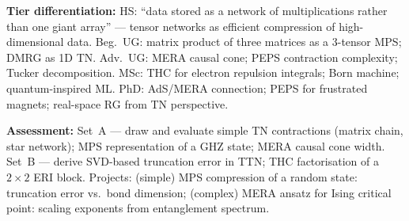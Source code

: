\documentclass[11pt,a4paper]{article}
\begin{document}
\begin{tcolorbox}[modulebox, title={Module~II.1 --- Lecture L08: Tensor Networks}]
\medskip\textbf{Tier differentiation:}
HS: ``data stored as a network of multiplications rather than one giant array'' ---
tensor networks as efficient compression of high-dimensional data.
Beg.\ UG: matrix product of three matrices as a 3-tensor MPS; DMRG as 1D TN.
Adv.\ UG: MERA causal cone; PEPS contraction complexity; Tucker decomposition.
MSc: THC for electron repulsion integrals; Born machine; quantum-inspired ML.
PhD: AdS/MERA connection; PEPS for frustrated magnets; real-space RG from TN perspective.

\medskip\textbf{Assessment:}
Set~A --- draw and evaluate simple TN contractions (matrix chain, star network);
MPS representation of a GHZ state; MERA causal cone width.
Set~B --- derive SVD-based truncation error in TTN; THC factorisation of a $2\times2$ ERI block.
Projects: (simple) MPS compression of a random state: truncation error vs.\ bond dimension;
(complex) MERA ansatz for Ising critical point: scaling exponents from entanglement spectrum.
\end{tcolorbox}

\medskip
\end{document}
